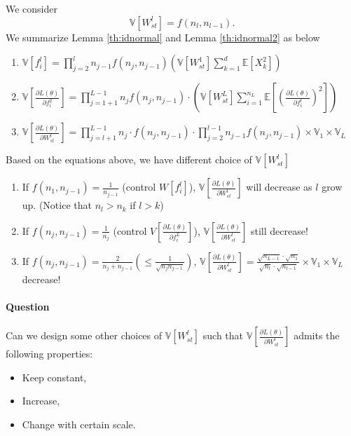 We consider
$$
	\mathbb{V}\left[W_{s t}^{l}\right]=f\left(n_{l}, n_{l-1}\right).
	$$
 We summarize Lemma \ref{th:idnormal} and Lemma \ref{th:idnormal2} as below
 \begin{enumerate}
\item 
$ 
\mathbb{V}\left[f_{i}^{l}\right]  =\prod\limits_{j=2}^{l} n_{j-1} f\left(n_{j}, n_{j-1}\right)\left(\mathbb{V}\left[W_{s t}^{1}\right]\sum\limits_{k=1}^{d} \mathbb{E}\left[ X_{k}^{2}\right]\right) 
$
\item $\mathbb{V}\left[\frac{\partial L(\theta)}{\partial f_{i}^{2}}\right]= \prod\limits_{j=1+1}^{L-1} n_{j} f\left(n_{j}, n_{j-1}\right)\cdot\left(\mathbb{V}\left[W_{s t}^{L}\right] \sum\limits_{i=1}^{n_{L}} \mathbb{E}\left[\left(\frac{\partial L( \theta)}{\partial f_{i}^{l}}\right)^{2}\right]\right) 
$
\item $ \mathbb{V}\left[\frac{\partial L(\theta)}{\partial W^{l} _{st}}\right] = \prod\limits_{j=l+1}^{L-1}n_{j} \cdot f\left(n_{j}, n_{j-1}\right) \cdot \prod\limits_{j=2}^{l-1}n_{j-1}f\left(n_{j}, n_{j-1}\right) \times \mathbb{V}_{1} \times \mathbb{V}_{L}
$
\end{enumerate}
Based on the equations above, we have different choice of $\mathbb{V}\left[W_{s t}^{l}\right]$
\begin{enumerate}
	\item If $f\left(n_{1}, n_{j-1}\right)=\frac{1}{n_{j-1}}$ (control $W[f_{i}^{l}]$), 
	$\mathbb{V}\left[\frac{\partial L(\theta)}{\partial W_{s t}^{l}}\right]$ will decrease as $l$ grow up. (Notice that $n_{l}>n_{k}$ if $l>k$)
	\item If $f\left(n_{j}, n_{j-1}\right)=\frac{1}{n_{j}}$ (control $V[\frac{\partial L(\theta)}{ \partial f_{i}^{L}} ]$),
	$
	\mathbb{V}\left[\frac{\partial L(\theta)}{\partial W_{s t}^{l}}\right]$	
	 still decrease!
	\item If $f\left(n_{j}, n_{j-1}\right)=\frac{2}{n_{j}+n_{j-1}}( \leq \frac{1}{\sqrt{n_{j} n_{j-1}}})$,
	$
	\mathbb{V}\left[\frac{\partial L (\theta)}{\partial W^{l}_{st}}\right]=\frac{\sqrt{n_{L-1}} \cdot \sqrt{n_{1}}}{\sqrt{n_{l}} \cdot \sqrt{n_{l-1}}} \times \mathbb{V}_{1} \times \mathbb{V}_{L}
	$
	decrease!
\end{enumerate}
	
\paragraph{Question}
Can we design some other choices of  $ \mathbb{V}\left[ W^{l} _{st}\right]$ such  that  $\mathbb{V} \left[\frac{\partial L(\theta)}{\partial W^{l} _{st}}\right]$ admits the following properties:
\begin{itemize}
	\item Keep constant,
	\item Increase,
	\item Change with certain scale.
\end{itemize}